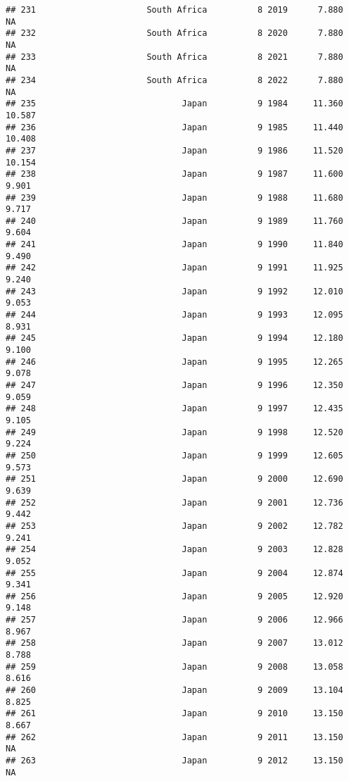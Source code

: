\documentclass[
]{article}
\begin{document}
\begin{verbatim}
## 231                      South Africa          8 2019      7.880         NA
## 232                      South Africa          8 2020      7.880         NA
## 233                      South Africa          8 2021      7.880         NA
## 234                      South Africa          8 2022      7.880         NA
## 235                             Japan          9 1984     11.360     10.587
## 236                             Japan          9 1985     11.440     10.408
## 237                             Japan          9 1986     11.520     10.154
## 238                             Japan          9 1987     11.600      9.901
## 239                             Japan          9 1988     11.680      9.717
## 240                             Japan          9 1989     11.760      9.604
## 241                             Japan          9 1990     11.840      9.490
## 242                             Japan          9 1991     11.925      9.240
## 243                             Japan          9 1992     12.010      9.053
## 244                             Japan          9 1993     12.095      8.931
## 245                             Japan          9 1994     12.180      9.100
## 246                             Japan          9 1995     12.265      9.078
## 247                             Japan          9 1996     12.350      9.059
## 248                             Japan          9 1997     12.435      9.105
## 249                             Japan          9 1998     12.520      9.224
## 250                             Japan          9 1999     12.605      9.573
## 251                             Japan          9 2000     12.690      9.639
## 252                             Japan          9 2001     12.736      9.442
## 253                             Japan          9 2002     12.782      9.241
## 254                             Japan          9 2003     12.828      9.052
## 255                             Japan          9 2004     12.874      9.341
## 256                             Japan          9 2005     12.920      9.148
## 257                             Japan          9 2006     12.966      8.967
## 258                             Japan          9 2007     13.012      8.788
## 259                             Japan          9 2008     13.058      8.616
## 260                             Japan          9 2009     13.104      8.825
## 261                             Japan          9 2010     13.150      8.667
## 262                             Japan          9 2011     13.150         NA
## 263                             Japan          9 2012     13.150         NA

\end{verbatim}
\end{document}
